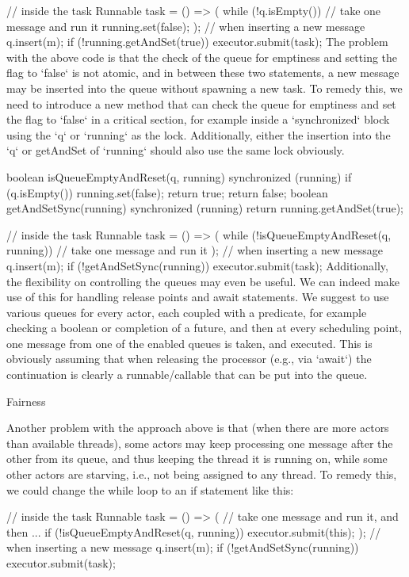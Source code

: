 // inside the task
Runnable task = () => (
while (!q.isEmpty()) {
	// take one message and run it
} 
running.set(false);
);
// when inserting a new message
q.insert(m);
if (!running.getAndSet(true)) {
	executor.submit(task);
}
The problem with the above code is that the check of the queue for emptiness and setting the flag to `false` is not atomic, and in between these two statements, a new message may be inserted into the queue without spawning a new task. To remedy this, we need to introduce a new method that can check the queue for emptiness and set the flag to `false` in a critical section, for example inside a `synchronized` block using the `q` or `running` as the lock. Additionally, either the insertion into the `q` or getAndSet of `running` should also use the same lock obviously.

boolean isQueueEmptyAndReset(q, running) {
	synchronized (running) {
		if (q.isEmpty()) {
			running.set(false);
			return true;
		} 
		return false; 
	}
}
boolean getAndSetSync(running) {
	synchronized (running) {
		return running.getAndSet(true);
	}
}

// inside the task
Runnable task = () => (
while (!isQueueEmptyAndReset(q, running)) {
	// take one message and run it
} 
);
// when inserting a new message
q.insert(m);
if (!getAndSetSync(running)) {
	executor.submit(task);
}
Additionally, the flexibility on controlling the queues may even be useful. We can indeed make use of this for handling release points and await statements. We suggest to use various queues for every actor, each coupled with a predicate, for example checking a boolean or completion of a future, and then at every scheduling point, one message from one of the enabled queues is taken, and executed. This is obviously assuming that when releasing the processor (e.g., via `await`) the continuation is clearly a runnable/callable that can be put into the queue.

Fairness

Another problem with the approach above is that (when there are more actors than available threads), some actors may keep processing one message after the other from its queue, and thus keeping the thread it is running on, while some other actors are starving, i.e., not being assigned to any thread. To remedy this, we could change the while loop to an if statement like this:

// inside the task
Runnable task = () => (
// take one message and run it, and then ...
if (!isQueueEmptyAndReset(q, running)) {
	executor.submit(this);
} 
);
// when inserting a new message
q.insert(m);
if (!getAndSetSync(running)) {
	executor.submit(task);
}


